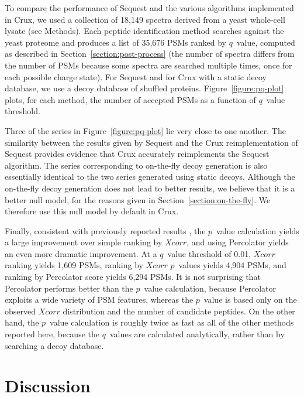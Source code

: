 \documentclass[12pt]{article}
\begin{document}
To compare the performance of {\sc Sequest} and the various algorithms
implemented in Crux, we used a collection of 18,149 spectra derived
from a yeast whole-cell lysate (see Methods).  Each peptide
identification method searches against the yeast proteome and produces
a list of 35,676 PSMs ranked by $q$~value, computed as described in
Section~\ref{section:post-process} (the number of spectra differs from
the number of PSMs because some spectra are searched multiple times,
once for each possible charge state).  For {\sc Sequest} and for Crux
with a static decoy database, we use a decoy database of shuffled
proteins.  Figure~\ref{figure:pq-plot} plots, for each method, the
number of accepted PSMs as a function of $q$~value threshold.

Three of the series in Figure~\ref{figure:pq-plot} lie very close to
one another.  The similarity between the results given by {\sc
Sequest} and the Crux reimplementation of {\sc Sequest} provides
evidence that Crux accurately reimplements the {\sc Sequest}
algorithm.  The series corresponding to on-the-fly decoy generation is
also essentially identical to the two series generated using static
decoys.  Although the on-the-fly decoy generation does not lead to
better results, we believe that it is a better null model, for the
reasons given in Section~\ref{section:on-the-fly}.  We therefore use
this null model by default in Crux.

Finally, consistent with previously reported results
\cite{klammer:not, kall:semi-supervised}, the $p$~value calculation
yields a large improvement over simple ranking by $Xcorr$, and using
Percolator yields an even more dramatic improvement.  At a $q$~value
threshold of 0.01, $Xcorr$ ranking yields 1,609 PSMs, ranking by
$Xcorr$ $p$~values yields 4,904 PSMs, and ranking by Percolator score
yields 6,294 PSMs.  It is not surprising that Percolator performs
better than the $p$~value calculation, because Percolator exploits a
wide variety of PSM features, whereas the $p$~value is based only on
the observed $Xcorr$ distribution and the number of candidate
peptides.  On the other hand, the $p$~value calculation is roughly
twice as fast as all of the other methods reported here, because the
$q$~values are calculated analytically, rather than by searching a
decoy database.

\section{Discussion}
\end{document}
